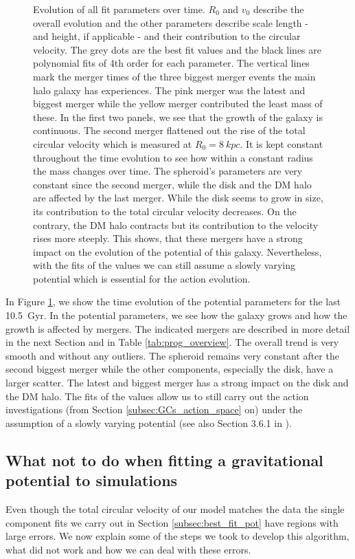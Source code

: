 \begin{figure}
\caption{Evolution of all fit parameters over time. $R_0$ and $v_0$ describe the overall evolution and the other parameters describe scale length - and height, if applicable - and their contribution to the circular velocity. The grey dots are the best fit values and the black lines are polynomial fits of 4th order for each parameter. The vertical lines mark the merger times of the three biggest merger events the main halo galaxy has experiences. The pink merger was the latest and biggest merger while the yellow merger contributed the least mass of these. In the first two panels, we see that the growth of the galaxy is continuous. The second merger flattened out the rise of the total circular velocity which is measured at $R_0 = \SI{8}{kpc}$. It is kept constant throughout the time evolution to see how within a constant radius the mass changes over time. The spheroid's parameters are very constant since the second merger, while the disk and the \ac{DM} halo are affected by the last merger. While the disk seems to grow in size, its contribution to the total circular velocity decreases. On the contrary, the \ac{DM} halo contracts but its contribution to the velocity rises more steeply. This shows, that these mergers have a strong impact on the evolution of the potential of this galaxy. Nevertheless, with the fits of the values we can still assume a slowly varying potential which is essential for the action evolution.}\label{fig:pot_val_evol}
\end{figure}
In Figure \ref{fig:pot_val_evol}, we show the time evolution of the potential parameters for the last \SI{10.5}{Gyr}. In the potential parameters, we see how the galaxy grows and how the growth is affected by mergers. The indicated mergers are described in more detail in the next Section and in Table \ref{tab:prog_overview}. The overall trend is very smooth and without any outliers. The spheroid remains very constant after the second biggest merger while the other components, especially the disk, have a larger scatter. The latest and biggest merger has a strong impact on the disk and the \ac{DM} halo. The fits of the values allow us to still carry out the action investigations (from Section \ref{subsec:GCs_action_space} on) under the assumption of a slowly varying potential (see also Section 3.6.1 in \citealp{Binney...Tremaine...2008}). 

\subsection{What not to do when fitting a gravitational potential to simulations}\label{subsec:wrong_pot_fit}
Even though the total circular velocity of our model matches the data the single component fits we carry out in Section \ref{subsec:best_fit_pot} have regions with large errors. We now explain some of the steps we took to develop this algorithm, what did not work and how we can deal with these errors.

